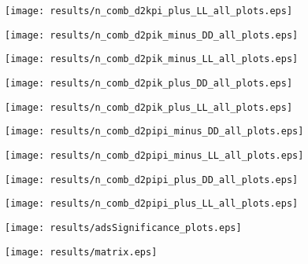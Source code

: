 \documentclass[11pt,a4paper]{article}
\begin{document}
\texttt{[image: results/n\_comb\_d2kpi\_plus\_LL\_all\_plots.eps]}

\texttt{[image: results/n\_comb\_d2pik\_minus\_DD\_all\_plots.eps]}

\texttt{[image: results/n\_comb\_d2pik\_minus\_LL\_all\_plots.eps]}

\texttt{[image: results/n\_comb\_d2pik\_plus\_DD\_all\_plots.eps]}

\texttt{[image: results/n\_comb\_d2pik\_plus\_LL\_all\_plots.eps]}

\texttt{[image: results/n\_comb\_d2pipi\_minus\_DD\_all\_plots.eps]}

\texttt{[image: results/n\_comb\_d2pipi\_minus\_LL\_all\_plots.eps]}

\texttt{[image: results/n\_comb\_d2pipi\_plus\_DD\_all\_plots.eps]}

\texttt{[image: results/n\_comb\_d2pipi\_plus\_LL\_all\_plots.eps]}
\fi

\texttt{[image: results/adsSignificance\_plots.eps]}


\clearpage
\texttt{[image: results/matrix.eps]}
\end{document}
